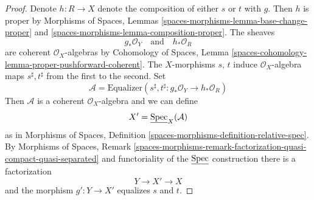\begin{proof}
Denote $h : R \to X$ denote the composition of either $s$ or $t$
with $g$. Then $h$ is proper by Morphisms of Spaces, Lemmas
\ref{spaces-morphisms-lemma-base-change-proper} and
\ref{spaces-morphisms-lemma-composition-proper}.
The sheaves
$$
g_*\mathcal{O}_Y
\quad\text{and}\quad
h_*\mathcal{O}_R
$$
are coherent $\mathcal{O}_X$-algebras by Cohomology of Spaces, Lemma
\ref{spaces-cohomology-lemma-proper-pushforward-coherent}.
The $X$-morphisms $s$, $t$ induce $\mathcal{O}_X$-algebra maps
$s^\sharp, t^\sharp$ from the first to the second.
Set
$$
\mathcal{A} = \text{Equalizer}\left(s^\sharp, t^\sharp :
g_*\mathcal{O}_Y \longrightarrow h_*\mathcal{O}_R\right)
$$
Then $\mathcal{A}$ is a coherent $\mathcal{O}_X$-algebra and we
can define
$$
X' = \underline{\operatorname{Spec}}_X(\mathcal{A})
$$
as in Morphisms of Spaces, Definition
\ref{spaces-morphisms-definition-relative-spec}.
By Morphisms of Spaces, Remark
\ref{spaces-morphisms-remark-factorization-quasi-compact-quasi-separated}
and functoriality of the $\underline{\operatorname{Spec}}$ construction
there is a factorization
$$
Y \longrightarrow X' \longrightarrow X
$$
and the morphism $g' : Y \to X'$ equalizes $s$ and $t$.


\end{proof}
